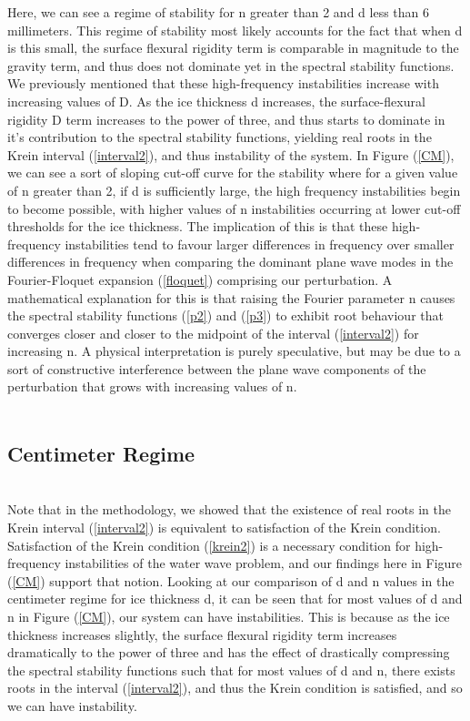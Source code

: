 \documentclass{article}
\begin{document}
Here, we can see a regime of stability for n greater than 2 and d less than 6 millimeters. This regime of stability most likely accounts for the fact that when d is this small, the surface flexural rigidity term is comparable in magnitude to the gravity term, and thus does not dominate yet in the spectral stability functions. We previously mentioned that these high-frequency instabilities increase with increasing values of D. As the ice thickness d increases, the surface-flexural rigidity D term increases to the power of three, and thus starts to dominate in it's contribution to the spectral stability functions, yielding real roots in the Krein interval (\ref{interval2}), and thus instability of the system. In Figure (\ref{CM}), we can see a sort of sloping cut-off curve for the stability where for a given value of n greater than 2, if d is sufficiently large, the high frequency instabilities begin to become possible, with higher values of n instabilities occurring at lower cut-off thresholds for the ice thickness. The implication of this is that these high-frequency instabilities tend to favour larger differences in frequency over smaller differences in frequency when comparing the dominant plane wave modes in the Fourier-Floquet expansion (\ref{floquet}) comprising our perturbation. A mathematical explanation for this is that raising the Fourier parameter n causes the spectral stability functions (\ref{p2}) and (\ref{p3}) to exhibit root behaviour that converges closer and closer to the midpoint of the interval (\ref{interval2}) for increasing n. A physical interpretation is purely speculative, but may be due to a sort of constructive interference between the plane wave components of the perturbation that grows with increasing values of n.
\\
\\


\subsection{Centimeter Regime}
\\

Note that in the methodology, we showed that the existence of real roots in the Krein interval (\ref{interval2}) is equivalent to satisfaction of the Krein condition. Satisfaction of the Krein condition (\ref{krein2}) is a necessary condition for high-frequency instabilities of the water wave problem, and our findings here in Figure (\ref{CM}) support that notion. Looking at our comparison of d and n values in the centimeter regime for ice thickness d, it can be seen that for most values of d and n in Figure (\ref{CM}), our system can have instabilities. This is because as the ice thickness increases slightly, the surface flexural rigidity term increases dramatically to the power of three and has the effect of drastically compressing the spectral stability functions such that for most values of d and n, there exists roots in the interval (\ref{interval2}), and thus the Krein condition is satisfied, and so we can have instability. 
\\
\end{document}
